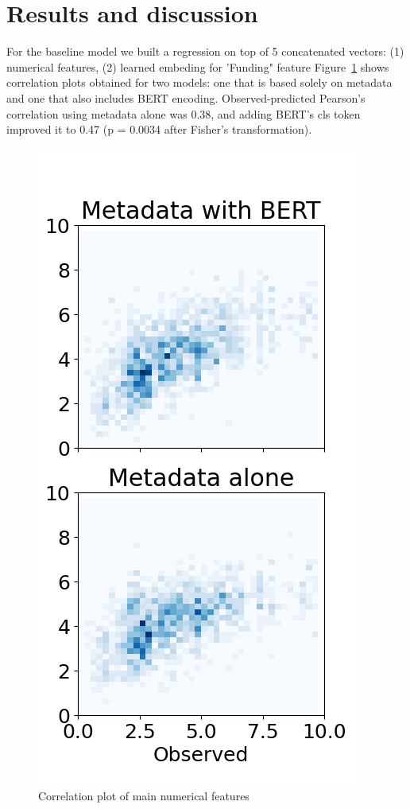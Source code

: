 \documentclass[11pt]{article}
\begin{document}
\section{Results and discussion}
For the baseline model we built a regression on top of 5 concatenated vectors: (1) numerical features, (2) learned embeding for 'Funding" feature
Figure~\ref{fig:correlations} shows correlation plots obtained for two models: one that is based solely on metadata and one that also includes BERT encoding. Observed-predicted Pearson's correlation using metadata alone was 0.38, and adding BERT's cls token improved it to 0.47 (p = 0.0034 after Fisher's transformation).
\begin{figure}
	\includegraphics[width= \columnwidth]{./Images/Metadata w BERT.png}
	\caption{Correlation plot of main numerical features}
	\label{fig:correlations}
\end{figure}
\end{document}

